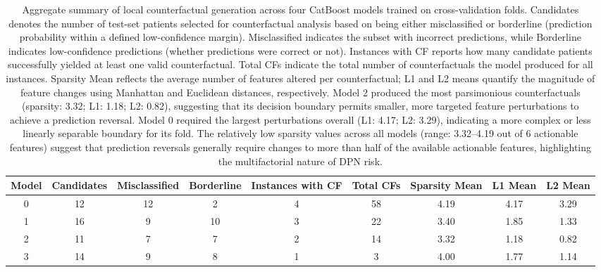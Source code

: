 \documentclass[pdflatex,sn-vancouver-num]{sn-jnl}
\begin{document}
\begin{table}[h]
\footnotesize
\centering
\begin{tabular}{ccccccccc}
\toprule
Model & Candidates & Misclassified & Borderline & Instances with CF & Total CFs & Sparsity Mean & L1 Mean & L2 Mean \\
\midrule
0 & 12 & 12 & 2 & 4 & 58 & 4.19 & 4.17 & 3.29 \\
1 & 16 & 9 & 10 & 3 & 22 & 3.40 & 1.85 & 1.33 \\
2 & 11 & 7 & 7 & 2 & 14 & 3.32 & 1.18 & 0.82 \\
3 & 14 & 9 & 8 & 1 & 3 & 4.00 & 1.77 & 1.14 \\
\bottomrule
\end{tabular}
\caption{Aggregate summary of local counterfactual generation across four CatBoost models trained on cross-validation folds. Candidates denotes the number of test-set patients selected for counterfactual analysis based on being either misclassified or borderline (prediction probability within a defined low-confidence margin). Misclassified indicates the subset with incorrect predictions, while Borderline indicates low-confidence predictions (whether predictions were correct or not). Instances with CF reports how many candidate patients successfully yielded at least one valid counterfactual. Total CFs indicate the total number of counterfactuals the model produced for all instances. Sparsity Mean reflects the average number of features altered per counterfactual; L1 and L2 means quantify the magnitude of feature changes using Manhattan and Euclidean distances, respectively. Model 2 produced the most parsimonious counterfactuals (sparsity: 3.32; L1: 1.18; L2: 0.82), suggesting that its decision boundary permits smaller, more targeted feature perturbations to achieve a prediction reversal. Model 0 required the largest perturbations overall (L1: 4.17; L2: 3.29), indicating a more complex or less linearly separable boundary for its fold. The relatively low sparsity values across all models (range: 3.32–4.19 out of 6 actionable features) suggest that prediction reversals generally require changes to more than half of the available actionable features, highlighting the multifactorial nature of DPN risk.
}
\label{tab:localcf-model-level}
\end{table}
\end{document}
